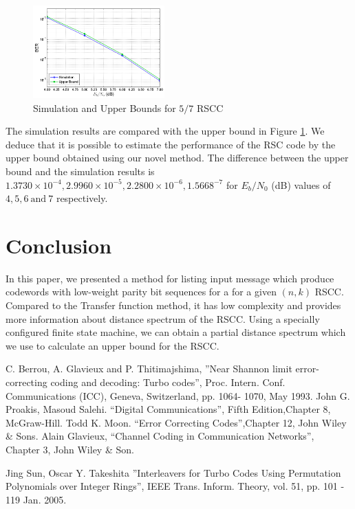 \documentclass[conference]{IEEEtran}
\begin{document}
\begin{figure}[h]
\centering
		\includegraphics[width=0.45\textwidth]{paperg2.png}
		\caption{Simulation and Upper Bounds for $5/7$ RSCC}
		\label{fig3}
		\end{figure}
		
		The simulation results are compared with the upper bound in Figure \ref{fig3}. 
	We deduce that it is possible to estimate the performance of the RSC code by the upper bound obtained using our novel method. The difference between the upper bound and the simulation results is $1.3730 \times 10^{-4}, 2.9960 \times 10^{-5},2.2800 \times 10^{-6}, 1.5668^{-7}$ for $E_b/N_0$ (dB) values of $4,5,6~\text{and}~7$ respectively. 

\section{Conclusion}
\label{sec6}

In this paper, we presented a method for listing input message which produce codewords with low-weight parity bit sequences for a for a given $(n,k)$ RSCC. Compared to the Transfer function method, it has low complexity and provides more information about distance spectrum of the RSCC. Using a specially configured finite state machine, we can obtain a partial distance spectrum which we use to calculate an upper bound for the RSCC.  


\begin{thebibliography}{99}
  C. Berrou, A. Glavieux and P. Thitimajshima, 
''Near Shannon limit error-correcting coding and
decoding: Turbo codes'', Proc. Intern. Conf. Communications (ICC), Geneva, 
Switzerland, pp. 1064-
1070, May 1993.
 John G. Proakis, Masoud Salehi. ``Digital Communications'', 
Fifth Edition,Chapter 8, McGraw-Hill.
 Todd K. Moon. ``Error Correcting Codes'',Chapter 12, John Wiley \& Sons.
Alain Glavieux, ``Channel Coding in Communication Networks'',\\ Chapter 3, John Wiley \& Son. 

 Jing Sun, Oscar Y. Takeshita ''Interleavers for Turbo Codes Using 
Permutation Polynomials over Integer Rings'', IEEE Trans. Inform. Theory, vol. 51, 
pp. 101 - 119  Jan. 2005.

\end{thebibliography}

%
\end{document}
